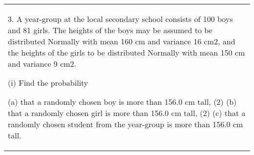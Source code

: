 \documentclass[a4paper,12pt]{article}
\begin{document}
  \begin{table}[ht!]
  \centering
  \begin{tabular}{|p{15cm}|}
  \hline
3. A year-group at the local secondary school consists of 100 boys and 81 girls.  The heights of the boys may be assumed to be distributed Normally with mean 160 cm and variance 16 cm2, and the heights of the girls to be distributed Normally with mean 150 cm and variance 9 cm2. 
 
(i) Find the probability 
 
  (a) that a randomly chosen boy is more than 156.0 cm tall,  (2)   (b) that a randomly chosen girl is more than 156.0 cm tall,  (2) (c) that a randomly chosen student from the year-group is more than 156.0 cm tall.     
  \hline
   \end{tabular}
 \end{table}
 
\end{document}
